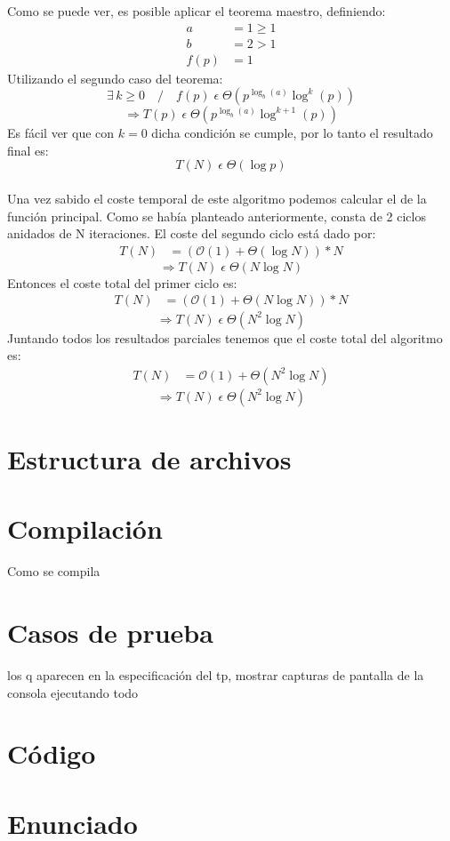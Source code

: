 \documentclass{article}
\begin{document}
    Como se puede ver, es posible aplicar el teorema maestro, definiendo:
    \begin{align*}
      a &= 1 \geq 1 \\
      b &= 2 > 1\\
   f(p) &= 1 
    \end{align*}
      Utilizando el segundo caso del teorema:
    $$ \exists\,k \geq 0 \quad / \quad f(p) \;\epsilon\; \Theta (p^{\log_b (a)} \log^k (p)) $$
    $$ \Rightarrow T(p)\;\epsilon\;\Theta (p^{\log_b (a)} \log^{k+1} (p)) $$
      Es fácil ver que con $k=0$ dicha condición se cumple, por lo tanto
    el resultado final es:
    $$ \boxed{T(N)\;\epsilon\;\Theta (\log p)} $$\\
	Una vez sabido el coste temporal de este algoritmo podemos calcular el de la función
	principal. Como se había planteado anteriormente, consta de 2 ciclos anidados de N iteraciones.
	El coste del segundo ciclo está dado por:
	\begin{align*}
      T(N) &= (\mathcal{O}(1) + {\Theta}(\log N)) * N
	\end{align*}
	  $$ \Rightarrow T(N)\;\epsilon\;\Theta (N\log N) $$
	Entonces el coste total del primer ciclo es:
	\begin{align*}
      T(N) &= (\mathcal{O}(1) + {\Theta}(N\log N)) * N
	\end{align*}
	$$ \Rightarrow T(N)\;\epsilon\;\Theta (N^2\log N) $$
	Juntando todos los resultados parciales tenemos que el coste total del algoritmo es:
	\begin{align*}
      T(N) &= \mathcal{O}(1) + {\Theta}(N^2\log N)
	\end{align*}
	$$ \Rightarrow T(N)\;\epsilon\;\Theta (N^2\log N) $$



\section{Estructura de archivos}

\section{Compilación}
Como se compila

\section{Casos de prueba}
los q aparecen en la especificación del tp, mostrar capturas de pantalla
de la consola ejecutando todo

\section{Código}


%    

\section{Enunciado}
\end{document}

